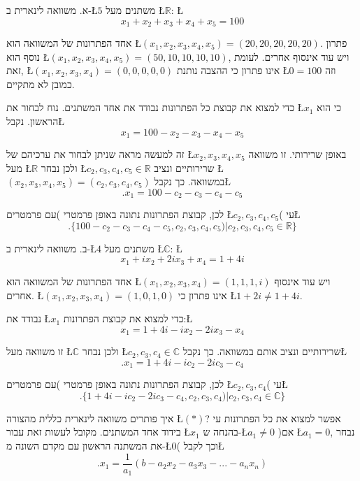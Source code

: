 \begin{examples}
א. משוואה לינארית ב-\L{$5$} משתנים מעל \L{$\mathbb{R}$}:
\L{%
\[
x_{1}+x_{2}+x_{3}+x_{4}+x_{5}=100
\]
}%

אחד הפתרונות של המשוואה הוא \L{$(x_{1},x_{2},x_{3},x_{4},x_{5})=(20,20,20,20,20)$}.
פתרון נוסף הוא \L{$(x_{1},x_{2},x_{3},x_{4},x_{5})=(50,10,10,10,10)$},
ויש עוד אינסוף אחרים. לעומת זאת, \L{$(x_{1},x_{2},x_{3},x_{4})=(0,0,0,0,0)$}
אינו פתרון כי ההצבה נותנת \L{$0=100$} וזה כמובן לא מתקיים.

כדי למצוא את קבוצת כל הפתרונות נבודד את אחד המשתנים. נוח לבחור את
\L{$x_{1}$} כי הוא הראשון. נקבל\L{%
\[
x_{1}=100-x_{2}-x_{3}-x_{4}-x_{5}
\]
}%

זה למעשה מראה שניתן לבחור את ערכיהם של \L{$x_{2},x_{3},x_{4},x_{5}$}
באופן שרירותי. זו משוואה מעל \L{$\mathbb{R}$} ולכן נבחר \L{$c_{2},c_{3},c_{4},c_{5}\in\mathbb{R}$}
שרירותיים ונציב \L{$(x_{2},x_{3},x_{4},x_{5})=(c_{2},c_{3},c_{4},c_{5})$}
במשוואה. כך נקבל\L{%
\[
.x_{1}=100-c_{2}-c_{3}-c_{4}-c_{5}
\]
}%

לכן, קבוצת הפתרונות נתונה באופן פרמטרי )עם {\endL} פרמטרים
\L{$c_{2},c_{3},c_{4},c_{5}$}( ע\textquotedbl י\L{%
\[
.\{100-c_{2}-c_{3}-c_{4}-c_{5},c_{2},c_{3},c_{4},c_{5})|c_{2},c_{3},c_{4},c_{5}\in\mathbb{R}\}
\]
}%

ב. משוואה לינארית ב-\L{$4$} משתנים מעל \L{$\mathbb{\mathbb{C}}$}:
\L{%
\[
x_{1}+ix_{2}+2ix_{3}+x_{4}=1+4i
\]
}%

אחד הפתרונות של המשוואה הוא \L{$(x_{1},x_{2},x_{3},x_{4})=(1,1,1,i)$}
ויש עוד אינסוף אחרים. \L{$(x_{1},x_{2},x_{3},x_{4})=(1,0,1,0)$} אינו
פתרון כי \L{$1+2i\neq1+4i$}.

נבודד את \L{$x_{1}$} כדי למצוא את קבוצת הפתרונות:\L{%
\[
x_{1}=1+4i-ix_{2}-2ix_{3}-x_{4}
\]
}%

זו משוואה מעל \L{$\mathbb{\mathbb{C}}$} ולכן נבחר \L{$c_{2},c_{3},c_{4}\in\mathbb{C}$}
שרירותיים ונציב אותם במשוואה. כך נקבל\L{%
\[
.x_{1}=1+4i-ic_{2}-2ic_{3}-c_{4}
\]
}%

לכן, קבוצת הפתרונות נתונה באופן פרמטרי )עם {\endL} פרמטרים
\L{$c_{2},c_{3},c_{4}$}( ע\textquotedbl י\L{%
\[
.\{1+4i-ic_{2}-2ic_{3}-c_{4},c_{2},c_{3},c_{4})|c_{2},c_{3},c_{4}\in\mathbb{\mathbb{C}}\}
\]
}%
\end{examples}

איך פותרים משוואה לינארית כללית מהצורה \L{$(*)$}? אפשר למצוא את כל
הפתרונות ע\textquotedbl י בידוד אחד המשתנים. מקובל לעשות זאת עבור
\L{$x_{1}$} בהנחה ש-\L{$a_{1}\neq0$} )אם \L{$a_{1}=0$}, נבחר את
המשתנה הראשון עם מקדם השונה מ-\L{$0$}( וכך לקבל\L{%
\[
.x_{1}=\frac{1}{a_{1}}(b-a_{2}x_{2}-a_{3}x_{3}-...-a_{n}x_{n})
\]
}%

